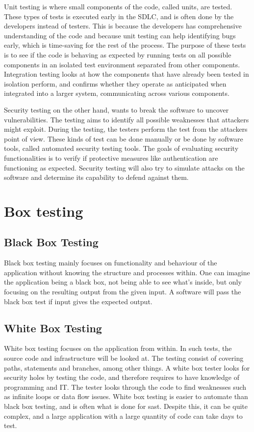 Unit testing is where small components of the code, called units, are tested. These types of tests is executed early in the SDLC, and is often done by the developers instead of testers. This is because the developers has comprehensive understanding of the code and because unit testing can help identifying bugs early, which is time-saving for the rest of the process. The purpose of these tests is to see if the code is behaving as expected by running tests on all possible components in an isolated test environment separated from other components. Integration testing looks at how the components that have already been tested in isolation perform, and confirms whether they operate as anticipated when integrated into a larger system, communicating across various components.\cite{unitvsintergration}

Security testing on the other hand, wants to break the software to uncover vulnerabilities. The testing aims to identify all possible weaknesses that attackers might exploit. During the testing, the testers perform the test from the attackers point of view. These kinds of test can be done manually or be done by software tools, called automated security testing tools. The goals of evaluating security functionalities is to verify if protective measures like authentication are functioning as expected. Security testing will also try to simulate attacks on the software and determine its capability to defend against them.\cite{whysectest}


\section{Box testing}
\label{boxtesting}
\subsection{Black Box Testing}
Black box testing mainly focuses on functionality and behaviour of the application without knowing the structure and processes within. One can imagine the application being a black box, not being able to see what's inside, but only focusing on the resulting output from the given input. A software will pass the black box test if input gives the expected output. \cite{blackbox}

\subsection{White Box Testing}
White box testing focuses on the application from within. In such tests, the source code and infrastructure will be looked at. The testing consist of covering paths, statements and branches, among other things. A white box tester looks for security holes by testing the code, and therefore requires to have knowledge of programming and IT. The tester looks through the code to find weaknesses such as infinite loops or data flow issues. White box testing is easier to automate than black box testing, and is often what is done for \acrlong{sast}. Despite this, it can be quite complex, and a large application with a large quantity of code can take days to test. \cite{whitebox}

